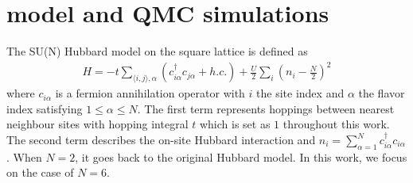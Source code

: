 \documentclass[twocolumn,superscriptaddress]{revtex4-1}
\begin{document}




\section{model and QMC simulations}
The SU(N) Hubbard model on the square lattice is defined as
\begin{eqnarray}
  H=-t\sum_{\langle i,j\rangle,\alpha}\left(c_{i\alpha}^\dag c_{j\alpha}
  +h.c.\right)+\frac{U}{2}\sum_{i}\left(n_i-\frac{N}{2}\right)^2
  \label{eq:hamilton}
\end{eqnarray}
where $c_{i\alpha}$ is a fermion annihilation operator with $i$ the site index and $\alpha$ the flavor index satisfying $1\le\alpha\le N$. The first term represents hoppings between nearest neighbour sites with hopping integral $t$ which is set as $1$ throughout this work. The second term describes the on-site Hubbard interaction and $n_i=\sum_{\alpha=1}^{N} c_{i\alpha}^\dag c_{i\alpha}$. When $N=2$, it goes back to the original Hubbard model. In this work, we focus on the case of $N=6$. 
\end{document}

